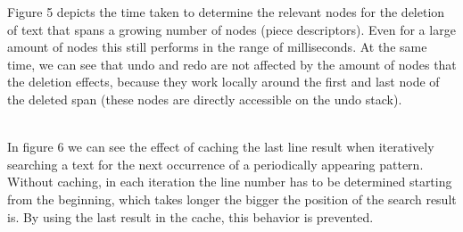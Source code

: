Figure 5 depicts the time taken to determine the relevant nodes for the deletion of text that spans a growing number of nodes (piece descriptors). Even for a large amount of nodes this still performs in the range of milliseconds. At the same time, we can see that undo and redo are not affected by the amount of nodes that the deletion effects, because they work locally around the first and last node of the deleted span (these nodes are directly accessible on the undo stack).

\noindent
\\In figure 6 we can see the effect of caching the last line result when iteratively searching a text for the next occurrence of a periodically appearing pattern. Without caching, in each iteration the line number has to be determined starting from the beginning, which takes longer the bigger the position of the search result is. By using the last result in the cache, this behavior is prevented.

